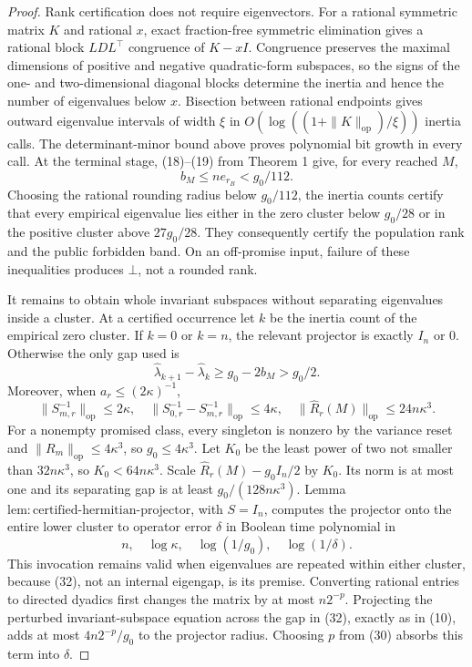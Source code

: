 \documentclass{article}
\begin{document}
\begin{proof}
Rank certification does not require eigenvectors.  For a rational symmetric matrix \(K\) and rational \(x\), exact fraction-free symmetric elimination gives a rational block \(LDL^{\top}\) congruence of \(K-xI\).  Congruence preserves the maximal dimensions of positive and negative quadratic-form subspaces, so the signs of the one- and two-dimensional diagonal blocks determine the inertia and hence the number of eigenvalues below \(x\).  Bisection between rational endpoints gives outward eigenvalue intervals of width \(\xi\) in \(O(\log((1+\|K\|_{\mathrm{op}})/\xi))\) inertia calls.  The determinant-minor bound above proves polynomial bit growth in every call.  At the terminal stage, (18)--(19) from Theorem 1 give, for every reached \(M\),
\[
 b_M\le ne_{r_B}<g_0/112.
 \tag{31}
\]
Choosing the rational rounding radius below \(g_0/112\), the inertia counts certify that every empirical eigenvalue lies either in the zero cluster below \(g_0/28\) or in the positive cluster above \(27g_0/28\).  They consequently certify the population rank and the public forbidden band.  On an off-promise input, failure of these inequalities produces \(\bot\), not a rounded rank.

It remains to obtain whole invariant subspaces without separating eigenvalues inside a cluster.  At a certified occurrence let \(k\) be the inertia count of the empirical zero cluster.  If \(k=0\) or \(k=n\), the relevant projector is exactly \(I_n\) or \(0\).  Otherwise the only gap used is
\[
 \widehat\lambda_{k+1}-\widehat\lambda_k
 \ge g_0-2b_M>g_0/2.
 \tag{32}
\]
Moreover, when \(a_r\le(2\kappa)^{-1}\),
\[
 \|S_{m,r}^{-1}\|_{\mathrm{op}}\le2\kappa,
 \quad
 \|S_{0,r}^{-1}-S_{m,r}^{-1}\|_{\mathrm{op}}\le4\kappa,
 \quad
 \|\widehat R_r(M)\|_{\mathrm{op}}\le24n\kappa^3.
 \tag{33}
\]
For a nonempty promised class, every singleton is nonzero by the variance reset and \(\|R_m\|_{\mathrm{op}}\le4\kappa^3\), so \(g_0\le4\kappa^3\).  Let \(K_0\) be the least power of two not smaller than \(32n\kappa^3\), so \(K_0<64n\kappa^3\).  Scale \(\widehat R_r(M)-g_0I_n/2\) by \(K_0\).  Its norm is at most one and its separating gap is at least \(g_0/(128n\kappa^3)\).  Lemma \(\mathrm{lem{:}certified\mbox{-}hermitian\mbox{-}projector}\), with \(S=I_n\), computes the projector onto the entire lower cluster to operator error \(\delta\) in Boolean time polynomial in
\[
 n,\quad \log\kappa,\quad \log(1/g_0),\quad \log(1/\delta).
 \tag{34}
\]
This invocation remains valid when eigenvalues are repeated within either cluster, because (32), not an internal eigengap, is its premise.  Converting rational entries to directed dyadics first changes the matrix by at most \(n2^{-p}\).  Projecting the perturbed invariant-subspace equation across the gap in (32), exactly as in (10), adds at most \(4n2^{-p}/g_0\) to the projector radius.  Choosing \(p\) from (30) absorbs this term into \(\delta\).


\end{proof}
\end{document}
